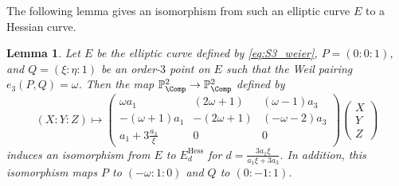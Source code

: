 \documentclass{amsart}
\newtheorem{lemma}[theorem]{Lemma}
\theoremstyle{definition}
\theoremstyle{remark}
\numberwithin{equation}{section}
\begin{document}
The following lemma gives an isomorphism
from such an elliptic curve $E$ to a Hessian curve.
\begin{lemma}\label{lem:isom_E_to_Hess}
    Let $E$ be the elliptic curve defined by \eqref{eq:S3_weier},
    $P = (0 : 0 : 1)$,
    and $Q = (\xi:\eta:1)$ be an order-$3$ point on $E$
    such that the Weil pairing $e_3(P, Q) = \omega$.
    Then the map $\mathbb{P}^2_\Comp \to \mathbb{P}^2_\Comp$ defined by
    \begin{equation*}
        (X:Y:Z) \mapsto
            \begin{pmatrix}
                \omega a_1 & (2\omega + 1) & (\omega - 1)a_3 \\
                -(\omega + 1)a_1 & -(2\omega + 1) & (-\omega - 2)a_3 \\
                a_1 + 3\frac{a_3}{\xi} & 0 & 0
            \end{pmatrix}
            \begin{pmatrix}
                X \\ Y \\ Z
            \end{pmatrix}
    \end{equation*}
    induces an isomorphism from $E$ to $E_d^\mathrm{Hess}$ for
    $d = \frac{3a_1\xi}{a_1\xi + 3a_3}$.
    In addition, this isomorphism maps $P$ to $(-\omega:1:0)$
    and $Q$ to $(0:-1:1)$.
\end{lemma}
\end{document}
